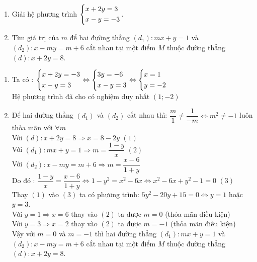 \begin{ex}%
\hfill
    \begin{enumerate} [1.]   
        \item Giải hệ phương trình $\left\{\begin{aligned}&x+2y=3\\ &x-y=-3\end{aligned}\right.$.
        \item Tìm giá trị của $m$ để hai đường thẳng $(d_1): mx+y=1$ và $(d_2): x-my=m+6$ cắt nhau tại một điểm $M$ thuộc  đường thẳng $(d):x+2y=8$.
    \end{enumerate}
\loigiai
    {
    \begin{enumerate}
        \item Ta có : $\left\{\begin{aligned}&x+2y=-3\\ &x-y=3\end{aligned}\right.\Leftrightarrow \left\{\begin{aligned}&3y=-6\\ &x-y=3\end{aligned}\right.\Leftrightarrow \left\{\begin{aligned}&x=1\\ &y=-2\end{aligned}\right.$\\
        Hệ phương trình đã cho có nghiệm duy nhất $(1;-2)$
       \item Để hai đường thẳng $(d_1)$ và $(d_2)$ cắt nhau thì: $\dfrac{m}{1}\neq \dfrac{1}{-m}\Leftrightarrow m^2\neq -1$ luôn thỏa mãn với $\forall m$\\
       Với $(d):x+2y=8\Rightarrow x=8-2y$ $(1)$\\
       Với $(d_1): mx+y=1\Rightarrow m=\dfrac{1-y}{x}$ $(2)$\\
       Với $(d_2): x-my=m+6\Rightarrow m=\dfrac{x-6}{1+y}$\\
     Do đó : $\dfrac{1-y}{x}=\dfrac{x-6}{1+y}\Leftrightarrow 1-y^2=x^2-6x\Leftrightarrow x^2-6x+y^2-1=0$ $(3)$\\
     Thay $(1)$ vào $(3)$ ta có phương trình: $5y^2-20y+15=0\Leftrightarrow y=1$ hoặc $y=3$.\\ 
     Với $y=1\Rightarrow x=6$ thay vào $(2)$ ta được $m=0$ (thỏa mãn điều kiện)\\
     Với $y=3\Rightarrow x=2$ thay vào $(2)$ ta được $m=-1$ (thỏa mãn điều kiện)\\
     Vậy với $m=0$ và $m=-1$ thì hai đường thẳng $(d_1): mx+y=1$ và $(d_2): x-my=m+6$ cắt nhau tại một điểm $M$ thuộc  đường thẳng $(d):x+2y=8$.
    \end{enumerate}
    }
\end{ex}

